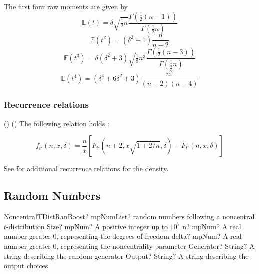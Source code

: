 The first four raw moments are given by
\begin{equation}
\mathbb{E}(t)=\delta \sqrt{\tfrac{1}{2}n} \frac{\Gamma\left(\tfrac{1}{2}(n-1)\right)}{\Gamma\left(\tfrac{1}{2}n\right)} 
\end{equation}
\begin{equation}
\mathbb{E}(t^2)= (\delta^2+1) \frac{n}{n-2} 
\end{equation}
\begin{equation}
\mathbb{E}(t^3)=\delta(\delta^2+3) \sqrt{\tfrac{1}{8}n^3} \frac{\Gamma\left(\tfrac{1}{2}(n-3)\right)}{\Gamma\left(\tfrac{1}{2}n\right)} 
\end{equation}
\begin{equation}
\mathbb{E}(t^4)= (\delta^4+ 6\delta^2+3) \frac{n^2}{(n-2)(n-4)} 
\end{equation}





\subsubsection{Recurrence relations}
(\label{eq:NonCentralT_Recursion_pdf})
(\label{eq:NonCentralT_Recursion_CDF})
The following relation holds  \citep{Witkovsky_2013}:

\begin{equation} 
f_{t'}(n,x, \delta) = \frac{n}{x} \left[F_{t'}\left(n+2,x\sqrt{1+2/n}, \delta\right)-F_{t'}(n,x, \delta) \right]
\end{equation} 

See \cite{Wang1993} for additional recurrence relations for the density.






\subsection{Random Numbers}
\label{NoncentraltDistributionRandomBoost}

\begin{mpFunctionsExtract}
	\mpFunctionFiveNotImplemented
	{NoncentralTDistRanBoost? mpNumList? random numbers following a noncentral $t$-distribution}
	{Size? mpNum? A positive integer up to $10^7$}
	{n? mpNum? A real number greater 0, representing the degrees of freedom}
	{delta? mpNum? A real number greater 0, representing the noncentrality parameter}
	{Generator? String? A string describing the random generator}
	{Output? String? A string describing the output choices}
\end{mpFunctionsExtract}


